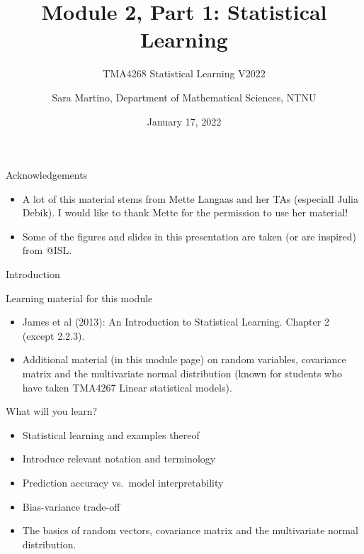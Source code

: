 \documentclass[
  ignorenonframetext,
]{beamer}
\title{Module 2, Part 1: Statistical Learning}
\subtitle{TMA4268 Statistical Learning V2022}
\author{Sara Martino, Department of Mathematical Sciences, NTNU}
\date{January 17, 2022}
\begin{document}
\frame{\titlepage}

\begin{frame}{Acknowledgements}
\protect\hypertarget{acknowledgements}{}
\begin{itemize}
\item
  A lot of this material stems from Mette Langaas and her TAs (especiall
  Julia Debik). I would like to thank Mette for the permission to use
  her material!
\item
  Some of the figures and slides in this presentation are taken (or are
  inspired) from @ISL.
\end{itemize}
\end{frame}

\begin{frame}{Introduction}
\protect\hypertarget{introduction}{}
\begin{block}{Learning material for this module}
\protect\hypertarget{learning-material-for-this-module}{}
\(~\)

\begin{itemize}
\item
  James et al (2013): An Introduction to Statistical Learning. Chapter 2
  (except 2.2.3).
\item
  Additional material (in this module page) on random variables,
  covariance matrix and the multivariate normal distribution (known for
  students who have taken TMA4267 Linear statistical models).
\end{itemize}
\end{block}
\end{frame}

\begin{frame}
\begin{block}{What will you learn?}
\protect\hypertarget{what-will-you-learn}{}
\vspace{2mm}

\begin{itemize}
\item
  Statistical learning and examples thereof \vspace{1mm}
\item
  Introduce relevant notation and terminology \vspace{1mm}
\item
  Prediction accuracy vs.~model interpretability \vspace{1mm}
\item
  Bias-variance trade-off \vspace{1mm}
\item
  The basics of random vectors, covariance matrix and the multivariate
  normal distribution.
\end{itemize}
\end{block}
\end{frame}
\end{document}
